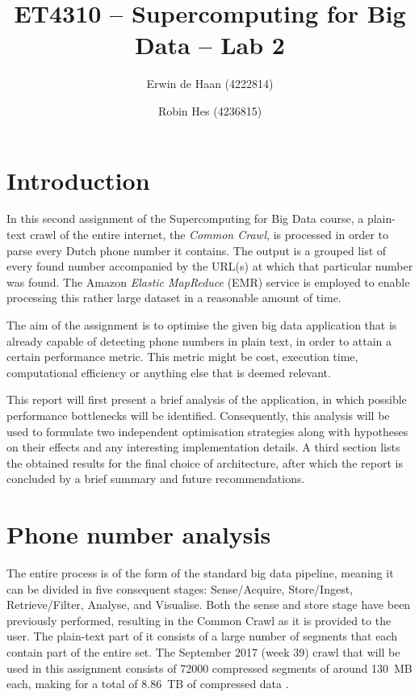 \documentclass{article}
\title{ET4310 -- Supercomputing for Big Data -- Lab 2}
\author{Erwin de Haan (4222814) \and Robin Hes (4236815)}
\begin{document}
\maketitle
\section{Introduction}
In this second assignment of the Supercomputing for Big Data course, a plain-text crawl of the entire internet, the \emph{Common Crawl}, is processed in order to parse every Dutch phone number it contains.
The output is a grouped list of every found number accompanied by the URL(s) at which that particular number was found.
The Amazon \emph{Elastic MapReduce} (EMR) service is employed to enable processing this rather large dataset in a reasonable amount of time.

The aim of the assignment is to optimise the given big data application that is already capable of detecting phone numbers in plain text, in order to attain a certain performance metric.
This metric might be cost, execution time, computational efficiency or anything else that is deemed relevant.

This report will first present a brief analysis of the application, in which possible performance bottlenecks will be identified.
Consequently, this analysis will be used to formulate two independent optimisation strategies along with hypotheses on their effects and any interesting implementation details.
A third section lists the obtained results for the final choice of architecture, after which the report is concluded by a brief summary and future recommendations.

\section{Phone number analysis}
The entire process is of the form of the standard big data pipeline, meaning it can be divided in five consequent stages: Sense/Acquire, Store/Ingest, Retrieve/Filter, Analyse, and Visualise.
Both the sense and store stage have been previously performed, resulting in the Common Crawl as it is provided to the user.
The plain-text part of it consists of a large number of segments that each contain part of the entire set.
The September 2017 (week 39) crawl that will be used in this assignment consists of \num{72000} compressed segments of around \SI{130}{MB} each, making for a total of \SI{8.86}{TB} of compressed data \cite{commoncrawl2017september}.
\end{document}
